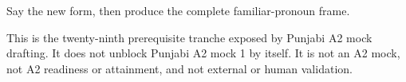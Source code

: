 \begin{tcolorbox}[breakable,colback=teal!4,colframe=teal!35!black,title={Before you move on}]
Say the new form, then produce the complete familiar-pronoun frame.

This is the twenty-ninth prerequisite tranche exposed by Punjabi A2 mock drafting. It does not unblock Punjabi A2 mock 1 by itself. It is not an A2 mock, not A2 readiness or attainment, and not external or human validation.
\end{tcolorbox}
